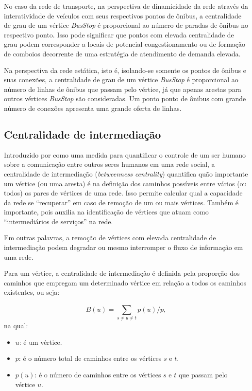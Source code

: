 No caso da rede de transporte, na perspectiva de dinamicidade da rede através da interatividade de veículos com seus respectivos pontos de ônibus, a centralidade de grau de um vértice \emph{BusStop} é proporcional ao número de paradas de ônibus no respectivo ponto. Isso pode significar que pontos com elevada centralidade de grau podem corresponder a locais de potencial congestionamento ou de formação de comboios decorrente de uma estratégia de atendimento de demanda elevada. 

Na perspectiva da rede estática, isto é, isolando-se somente os pontos de ônibus e suas conexões, a centralidade de grau de um vértice \emph{BusStop} é proporcional ao número de linhas de ônibus que passam pelo vértice, já que apenas arestas para outros vértices \emph{BusStop} são consideradas. Um ponto ponto de ônibus com grande número de conexões apresenta uma grande oferta de linhas.

\subsection{Centralidade de intermediação}


Introduzido por \cite{free:77} como uma medida para quantificar o controle de um ser humano sobre a comunicação entre outros seres humanos em uma rede social, a centralidade de intermediação (\emph{betweenness centrality}) quantifica quão importante um vértice (ou uma aresta) é na definição dos caminhos possíveis entre vários (ou todos) os pares de vértices de uma rede. Isso permite calcular qual a capacidade da rede se ``recuperar'' em caso de remoção de um ou mais vértices. Também é importante, pois auxilia na identificação de vértices que atuam como ``intermediários de serviços'' na rede.

Em outras palavras, a remoção de vértices com elevada centralidade de intermediação podem degradar ou mesmo interromper o fluxo de informação em uma rede. 

Para um vértice, a centralidade de intermediação é definida pela proporção dos caminhos que empregam um determinado vértice em relação a todos os caminhos existentes, ou seja:

 \begin{equation}
     B(u) = \sum_{s \neq u \neq t }^{} p(u) / p,
 \end{equation} 
na qual:

 \begin{itemize}
 \item $u$: é um vértice.
 \item $p$: é o número total de caminhos entre os vértices $s$ e $t$.
 \item $p(u)$: é o número de caminhos entre os vértices $s$ e $t$ que passam pelo vértice $u$.
\end{itemize}  

